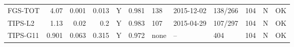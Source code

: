 \begin{longtable}{lrrrcrlllrcc}
FGS-TOT & 4.07 & 0.001 & 0.013 & Y & 0.981 & 138 & 2015-12-02 & 138/266 & 104 & N & OK\\
TIPS-L2 & 1.13 & 0.02 & 0.2 & Y & 0.983 & 107 & 2015-04-29 & 107/297 & 104 & N & OK\\
TIPS-G11 & 0.901 & 0.063 & 0.315 & Y & 0.972 & none & -- & 404 & 104 & N & OK\\

\end{longtable}
